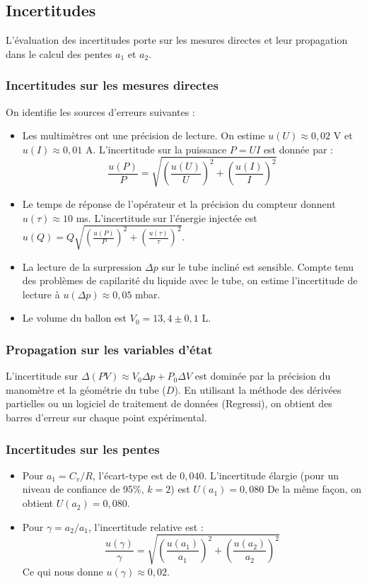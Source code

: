 \documentclass[a4paper,9pt,french]{scrartcl}
\begin{document}
\subsection{Incertitudes}

L'évaluation des incertitudes porte sur les mesures directes et leur propagation dans le calcul des pentes $a_1$ et $a_2$.

\subsubsection{Incertitudes sur les mesures directes}
On identifie les sources d'erreurs suivantes :
\begin{itemize}
    \item Les multimètres ont une précision de lecture. On estime $u(U) \approx 0,02$ V et $u(I) \approx 0,01$ A. L'incertitude sur la puissance $P = UI$ est donnée par :
    $$\frac{u(P)}{P} = \sqrt{\left(\frac{u(U)}{U}\right)^2 + \left(\frac{u(I)}{I}\right)^2}$$
    \item Le temps de réponse de l'opérateur et la précision du compteur donnent $u(\tau) \approx 10$ ms. L'incertitude sur l'énergie injectée est $u(Q) = Q \sqrt{(\frac{u(P)}{P})^2 + (\frac{u(\tau)}{\tau})^2}$.
    \item La lecture de la surpression $\Delta p$ sur le tube incliné est sensible. Compte tenu des problèmes de capilarité du liquide avec le tube, on estime l'incertitude de lecture à $u(\Delta p) \approx 0,05$ mbar.
    \item Le volume du ballon est $V_0 = 13,4 \pm 0,1$ L.
\end{itemize}

\subsubsection{Propagation sur les variables d'état}
L'incertitude sur $\Delta(PV) \approx V_0 \Delta p + P_0 \Delta V$ est dominée par la précision du manomètre et la géométrie du tube ($D$). 
En utilisant la méthode des dérivées partielles ou un logiciel de traitement de données (Regressi), on obtient des barres d'erreur sur chaque point expérimental.

\subsubsection{Incertitudes sur les pentes}
\begin{itemize}
    \item Pour $a_1 = C_v/R$, l'écart-type est de $0,040$. L'incertitude élargie (pour un niveau de confiance de 95\%, $k=2$) est $U(a_1) = 0,080$ De la m\^eme façon, on obtient $U(a_2) = 0,080$.
    \item Pour $\gamma = a_2/a_1$, l'incertitude relative est :
    $$\frac{u(\gamma)}{\gamma} = \sqrt{\left(\frac{u(a_1)}{a_1}\right)^2 + \left(\frac{u(a_2)}{a_2}\right)^2}$$
    Ce qui nous donne $u(\gamma) \approx 0,02$. 
\end{itemize}
\end{document}
